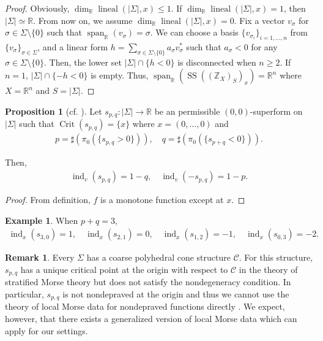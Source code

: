 \documentclass[a4paper,dvipdfmx,reqno,12pt]{amsart}
\theoremstyle{definition}
\newtheorem{example}[theorem]{Example}
\newtheorem{proposition}[theorem]{Proposition}
\newtheorem{remark}[theorem]{Remark}
\newcommand{\opn}[1]{\operatorname{#1}}
\numberwithin{equation}{section}
\begin{document}
\begin{proof}
Obviously, 
$\opn{dim}_{\mathbb{R}}\opn{lineal}(|\Sigma|,x)\leq 1$.
If $\opn{dim}_{\mathbb{R}}\opn{lineal}(|\Sigma |,x)=1$, 
then $|\Sigma | \simeq \mathbb{R}$. 
From now on, we assume $\dim_{\mathbb{R}}\opn{lineal}(|\Sigma|,x)=0$.
Fix a vector $v_{\sigma}$ for $\sigma\in \Sigma \setminus\{0\}$ 
such that $\opn{span}_{\mathbb{R}}(v_{\sigma})=\sigma$.
We can choose a basis $\{v_{\sigma_i}\}_{i=1,\ldots, n}$ 
from $\{v_{\sigma}\}_{\sigma \in \Sigma}$,
and a linear form
$h=\sum_{\sigma \in \Sigma \setminus\{0\}} a_\sigma v^{*}_\sigma$
such that $a_\sigma<0$ for any 
$\sigma \in \Sigma \setminus\{0\}$.
Then, the lower set $|\Sigma|\cap \{h< 0\}$ is disconnected
when $n\geq 2$. If $n=1$, $|\Sigma|\cap \{-h<0\}$ is 
empty.
Thus, 
$\opn{span}_{\mathbb{R}}(\opn{SS}((\mathbb{Z}_{X})_S)_x)
=\mathbb{R}^{n}$ where $X=\mathbb{R}^{n}$ and $S=|\Sigma|$.
\end{proof}



\begin{proposition}[{cf. \cite{knill2012graph}}]
\label{proposition-n-valent}
Let $s_{p,q}\colon |\Sigma|\to \mathbb{R}$ be 
an permissible $(0,0)$-superform on $|\Sigma|$ 
such that $\opn{Crit}(s_{p,q})=\{x\}$ where
$x=(0,\ldots,0)$ and
\begin{align}
p=\sharp(\pi_0(\{s_{p,q}>0\})), \quad 
q=\sharp(\pi_0(\{s_{p+q}<0\})).
\end{align}

Then, 
\begin{align}
\opn{ind}_v(s_{p,q})=1-q ,\quad \opn{ind}_v(-s_{p,q})=1-p.
\end{align}

\end{proposition}

\begin{proof}
From definition, $f$ is a monotone function except 
at $x$.
\end{proof}

\begin{example}
When $p+q=3$, 
\begin{align}
\opn{ind}_x(s_{3,0})=1, \quad 
\opn{ind}_x(s_{2,1})=0, \quad \opn{ind}_x(s_{1,2})=-1, 
\quad \opn{ind}_x(s_{0,3})=-2.
\end{align}
\end{example}

\begin{remark}
\label{remark-nondeprave-curve}
Every $\Sigma$ has a coarse polyhedral cone structure 
$\mathscr{C}$. 
For this structure, $s_{p,q}$ has a unique critical 
point at the origin with respect to 
$\mathscr{C}$ in the theory of stratified 
Morse theory \cite[Part I.2.1]{MR932724}
but does not satisfy the nondegeneracy condition.
In particular, $s_{p,q}$ is not nondepraved 
at the origin \cite[Part I.2.3.]{MR932724} 
and thus we cannot use the theory of local Morse 
data for nondepraved functions directly 
\cite[Part I.3.5.2 Definition]{MR932724}. 
We expect, however, that there exists a 
generalized version of local Morse data 
which can apply for our settings.
\end{remark}
\end{document}
